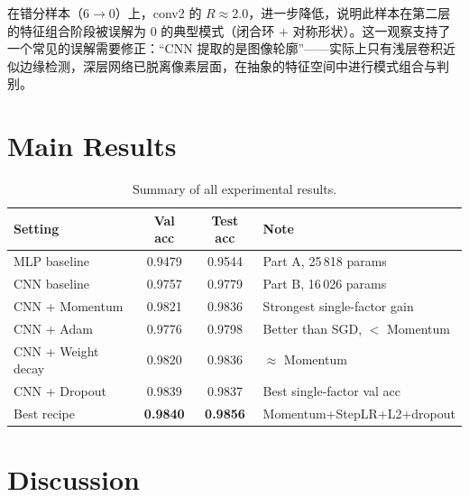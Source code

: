\documentclass[11pt,fontset=fandol]{ctexart}
\begin{document}
在错分样本（$6 \to 0$）上，conv2 的 $R \approx 2.0$，进一步降低，说明此样本在第二层的特征组合阶段被误解为 $0$ 的典型模式（闭合环 $+$ 对称形状）。这一观察支持了一个常见的误解需要修正：``CNN 提取的是图像轮廓''——实际上只有浅层卷积近似边缘检测，深层网络已脱离像素层面，在抽象的特征空间中进行模式组合与判别。

\section{Main Results}

\begin{table}[H]
\centering\small
\begin{tabular}{@{}lccl@{}}
\toprule
Setting & Val acc & Test acc & Note \\
\midrule
MLP baseline       & 0.9479 & 0.9544 & Part A, 25\,818 params \\
CNN baseline        & 0.9757 & 0.9779 & Part B, 16\,026 params \\
CNN + Momentum      & 0.9821 & 0.9836 & Strongest single-factor gain \\
CNN + Adam          & 0.9776 & 0.9798 & Better than SGD, $<$ Momentum \\
CNN + Weight decay  & 0.9820 & 0.9836 & $\approx$ Momentum \\
CNN + Dropout       & 0.9839 & 0.9837 & Best single-factor val acc \\
Best recipe         & \textbf{0.9840} & \textbf{0.9856} & Momentum+StepLR+L2+dropout \\
\bottomrule
\end{tabular}
\caption{Summary of all experimental results.}\label{tab:summary}
\end{table}

\section{Discussion}
\end{document}
